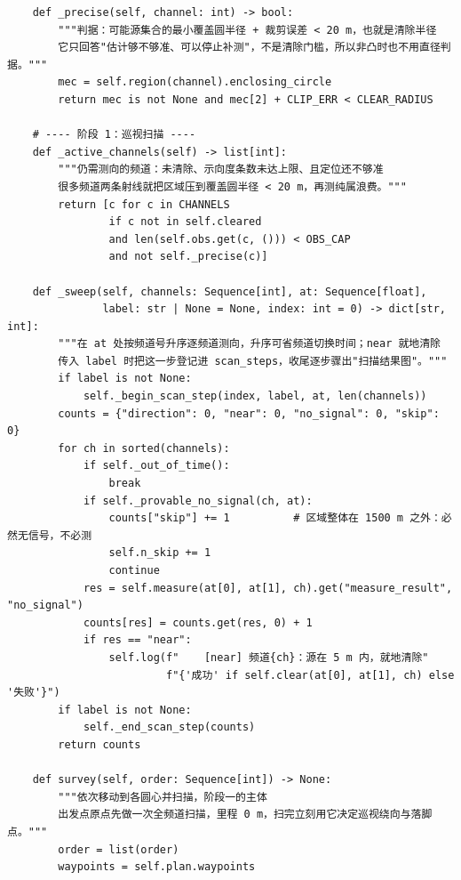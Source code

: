 \documentclass[UTF8, zihao=5,AutoFakeBold=2]{ctexart}
\begin{document}
\begin{lstlisting}
    def _precise(self, channel: int) -> bool:
        """判据：可能源集合的最小覆盖圆半径 + 裁剪误差 < 20 m，也就是清除半径
        它只回答"估计够不够准、可以停止补测"，不是清除门槛，所以非凸时也不用直径判据。"""
        mec = self.region(channel).enclosing_circle
        return mec is not None and mec[2] + CLIP_ERR < CLEAR_RADIUS

    # ---- 阶段 1：巡视扫描 ----
    def _active_channels(self) -> list[int]:
        """仍需测向的频道：未清除、示向度条数未达上限、且定位还不够准
        很多频道两条射线就把区域压到覆盖圆半径 < 20 m，再测纯属浪费。"""
        return [c for c in CHANNELS
                if c not in self.cleared
                and len(self.obs.get(c, ())) < OBS_CAP
                and not self._precise(c)]

    def _sweep(self, channels: Sequence[int], at: Sequence[float],
               label: str | None = None, index: int = 0) -> dict[str, int]:
        """在 at 处按频道号升序逐频道测向，升序可省频道切换时间；near 就地清除
        传入 label 时把这一步登记进 scan_steps，收尾逐步骤出"扫描结果图"。"""
        if label is not None:
            self._begin_scan_step(index, label, at, len(channels))
        counts = {"direction": 0, "near": 0, "no_signal": 0, "skip": 0}
        for ch in sorted(channels):
            if self._out_of_time():
                break
            if self._provable_no_signal(ch, at):
                counts["skip"] += 1          # 区域整体在 1500 m 之外：必然无信号，不必测
                self.n_skip += 1
                continue
            res = self.measure(at[0], at[1], ch).get("measure_result", "no_signal")
            counts[res] = counts.get(res, 0) + 1
            if res == "near":
                self.log(f"    [near] 频道{ch}：源在 5 m 内，就地清除"
                         f"{'成功' if self.clear(at[0], at[1], ch) else '失败'}")
        if label is not None:
            self._end_scan_step(counts)
        return counts

    def survey(self, order: Sequence[int]) -> None:
        """依次移动到各圆心并扫描，阶段一的主体
        出发点原点先做一次全频道扫描，里程 0 m，扫完立刻用它决定巡视绕向与落脚点。"""
        order = list(order)
        waypoints = self.plan.waypoints


\end{lstlisting}
\end{document}
